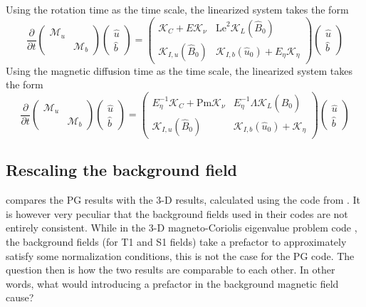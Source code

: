 Using the rotation time as the time scale, the linearized system takes the form
\begin{equation}
    \frac{\partial}{\partial t} \begin{pmatrix} \mathcal{M}_u & \\ & \mathcal{M}_b \end{pmatrix}
    \begin{pmatrix} \hat{u} \\ \hat{b} \end{pmatrix} = 
    \begin{pmatrix}
        \mathcal{K}_C + E \mathcal{K}_\nu & \mathrm{Le}^2 \mathcal{K}_{L}(\hat{B}_0) \\ 
        \mathcal{K}_{I,u}(\hat{B}_0) & \mathcal{K}_{I,b}(\hat{u}_0) + E_\eta \mathcal{K}_\eta
    \end{pmatrix}
    \begin{pmatrix} \hat{u} \\ \hat{b} \end{pmatrix}
\end{equation}
Using the magnetic diffusion time as the time scale, the linearized system takes the form
\begin{equation}
    \frac{\partial}{\partial t} \begin{pmatrix} \mathcal{M}_u & \\ & \mathcal{M}_b \end{pmatrix}
    \begin{pmatrix} \hat{u} \\ \hat{b} \end{pmatrix} = 
    \begin{pmatrix}
        E_\eta^{-1} \mathcal{K}_C + \mathrm{Pm} \mathcal{K}_\nu & E_\eta^{-1} \Lambda \mathcal{K}_{L}(\hat{B}_0) \\ 
        \mathcal{K}_{I,u}(\hat{B}_0) & \mathcal{K}_{I,b}(\hat{u}_0) + \mathcal{K}_\eta
    \end{pmatrix}
    \begin{pmatrix} \hat{u} \\ \hat{b} \end{pmatrix}
\end{equation}


\subsection{Rescaling the background field}

\textcite{holdenried-chernoff_long_2021} compares the PG results with the 3-D results, calculated using the code from \textcite{luo_waves2_2022}. It is however very peculiar that the background fields used in their codes are not entirely consistent. While in the 3-D magneto-Coriolis eigenvalue problem code \parencite{luo_waves2_2022}, the background fields (for T1 and S1 fields) take a prefactor to approximately satisfy some normalization conditions, this is not the case for the PG code.
The question then is how the two results are comparable to each other. In other words, what would introducing a prefactor in the background magnetic field cause?

